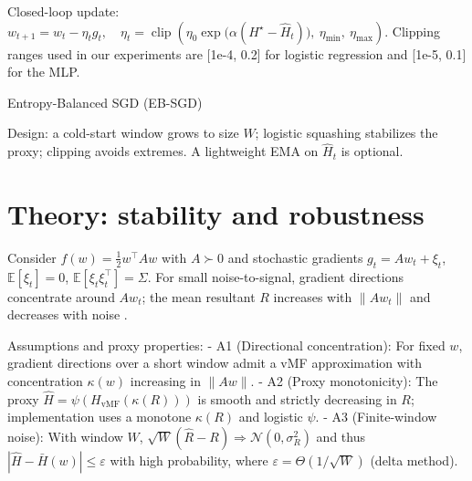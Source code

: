 Closed-loop update:
$
w_{t+1}=w_t-\eta_t g_t,\quad
\eta_t=\operatorname{clip}\left(\eta_0\exp\big(\alpha(H^\star-\widehat{H}_t)\big),~\eta_{\min},~\eta_{\max}\right).
$
Clipping ranges used in our experiments are [1e-4, 0.2] for logistic regression and [1e-5, 0.1] for the MLP.

\begin{adjustbox}{width=\linewidth}
\begin{algorithm}[H]
\DontPrintSemicolon
\SetAlgoLined
{}
\caption{Entropy-Balanced SGD (EB-SGD)}
\end{algorithm}
\end{adjustbox}

Design: a cold-start window grows to size $W$; logistic squashing stabilizes the proxy; clipping avoids extremes. A lightweight EMA on $\widehat{H}_t$ is optional.

\section{Theory: stability and robustness}
Consider $f(w)=\tfrac12 w^\top A w$ with $A\succ0$ and stochastic gradients $g_t=Aw_t+\xi_t$, $\mathbb{E}[\xi_t]=0$, $\mathbb{E}[\xi_t\xi_t^\top]=\Sigma$. For small noise-to-signal, gradient directions concentrate around $Aw_t$; the mean resultant $R$ increases with $\|Aw_t\|$ and decreases with noise \cite{MardiaJupp2000Directional}.

Assumptions and proxy properties:
- A1 (Directional concentration): For fixed $w$, gradient directions over a short window admit a vMF approximation with concentration $\kappa(w)$ increasing in $\|Aw\|$.
- A2 (Proxy monotonicity): The proxy $\widehat{H}=\psi(H_{\text{vMF}}(\kappa(R)))$ is smooth and strictly decreasing in $R$; implementation uses a monotone $\kappa(R)$ and logistic $\psi$.
- A3 (Finite-window noise): With window $W$, $\sqrt{W}(\hat{R}-R)\Rightarrow\mathcal{N}(0,\sigma_R^2)$ and thus $|\widehat{H}-\bar{H}(w)|\le \varepsilon$ with high probability, where $\varepsilon=\Theta(1/\sqrt{W})$ (delta method).

